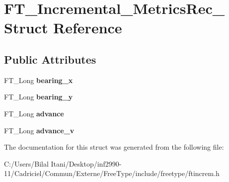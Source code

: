\hypertarget{struct_f_t___incremental___metrics_rec__}{}\section{F\+T\+\_\+\+Incremental\+\_\+\+Metrics\+Rec\+\_\+ Struct Reference}
\label{struct_f_t___incremental___metrics_rec__}
\subsection*{Public Attributes}
\begin{DoxyCompactItemize}
\item 
F\+T\+\_\+\+Long {\bfseries bearing\+\_\+x}\hypertarget{struct_f_t___incremental___metrics_rec___af065d998d0a0f2a57513125038d802a6}{}\label{struct_f_t___incremental___metrics_rec___af065d998d0a0f2a57513125038d802a6}

\item 
F\+T\+\_\+\+Long {\bfseries bearing\+\_\+y}\hypertarget{struct_f_t___incremental___metrics_rec___af1443aa7c1ca54d3c2a29f1cf6d7848b}{}\label{struct_f_t___incremental___metrics_rec___af1443aa7c1ca54d3c2a29f1cf6d7848b}

\item 
F\+T\+\_\+\+Long {\bfseries advance}\hypertarget{struct_f_t___incremental___metrics_rec___a996c99aa0e6b36c2c7776fc1a2b6b614}{}\label{struct_f_t___incremental___metrics_rec___a996c99aa0e6b36c2c7776fc1a2b6b614}

\item 
F\+T\+\_\+\+Long {\bfseries advance\+\_\+v}\hypertarget{struct_f_t___incremental___metrics_rec___a0ee280662a03ea935dbfe377e56f4d6d}{}\label{struct_f_t___incremental___metrics_rec___a0ee280662a03ea935dbfe377e56f4d6d}

\end{DoxyCompactItemize}


The documentation for this struct was generated from the following file\+:\begin{DoxyCompactItemize}
\item 
C\+:/\+Users/\+Bilal Itani/\+Desktop/inf2990-\/11/\+Cadriciel/\+Commun/\+Externe/\+Free\+Type/include/freetype/ftincrem.\+h\end{DoxyCompactItemize}

